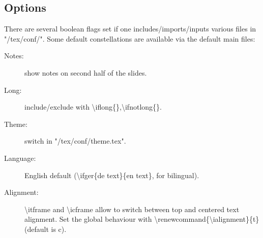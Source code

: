 \subsection{Options}
\begin{iframe}
There are several boolean flags set if one includes/imports/inputs various files in "/tex/conf/". Some default constellations are available via the default main files:

\begin{description}
\item[Notes:] show notes on second half of the slides.
\item[Long:] include/exclude with \textbackslash iflong\{\},\textbackslash ifnotlong\{\}.
\item[Theme:] switch in "/tex/conf/theme.tex".
\item[Language:] English default (\textbackslash ifger\{de text\}\{en text\}, for bilingual).
\item[Alignment:] \textbackslash itframe and \textbackslash icframe allow to switch between top and centered text alignment. Set the global behaviour with \textbackslash renewcommand\{\textbackslash ialignment\}\{t\} (default is c).
\end{description}
\end{iframe}